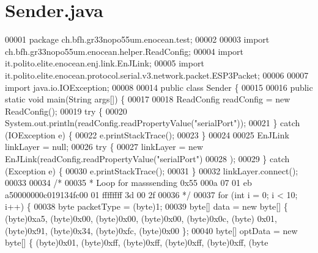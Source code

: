 \section{Sender.\+java}
\label{Sender_8java_source}

\begin{DoxyCode}
00001 \textcolor{keyword}{package }ch.bfh.gr33nopo55um.enocean.test;
00002 
00003 \textcolor{keyword}{import} ch.bfh.gr33nopo55um.enocean.helper.ReadConfig;
00004 \textcolor{keyword}{import} it.polito.elite.enocean.enj.link.EnJLink;
00005 \textcolor{keyword}{import} it.polito.elite.enocean.protocol.serial.v3.network.packet.ESP3Packet;
00006 
00007 \textcolor{keyword}{import} java.io.IOException;
00008 
00014 \textcolor{keyword}{public} \textcolor{keyword}{class }Sender \{
00015 
00016     \textcolor{keyword}{public} \textcolor{keyword}{static} \textcolor{keywordtype}{void} main(String args[]) \{
00017 
00018         ReadConfig readConfig = \textcolor{keyword}{new} ReadConfig();
00019         \textcolor{keywordflow}{try} \{
00020             System.out.println(readConfig.readPropertyValue(\textcolor{stringliteral}{"serialPort"}));
00021         \} \textcolor{keywordflow}{catch} (IOException e) \{
00022             e.printStackTrace();
00023         \}
00024 
00025         EnJLink linkLayer = null;
00026         \textcolor{keywordflow}{try} \{
00027             linkLayer = \textcolor{keyword}{new} EnJLink(readConfig.readPropertyValue(\textcolor{stringliteral}{"serialPort"})
00028             );
00029         \} \textcolor{keywordflow}{catch} (Exception e) \{
00030             e.printStackTrace();
00031         \}
00032         linkLayer.connect();
00033 
00034         \textcolor{comment}{/*}
00035 \textcolor{comment}{        * Loop for masssending 0x55 000a 07 01 eb a50000000c019134fc00 01 ffffffff 3d 00 2f}
00036 \textcolor{comment}{        */}
00037         \textcolor{keywordflow}{for} (\textcolor{keywordtype}{int} i = 0; i < 10; i++) \{
00038             byte packetType = (byte)1;
00039             byte[] data = \textcolor{keyword}{new} byte[] \{ (byte)0xa5, (byte)0x00, (byte)0x00, (byte)0x00, (byte)0x0c, (byte)
      0x01, (byte)0x91, (byte)0x34, (byte)0xfc, (byte)0x00 \};
00040             byte[] optData = \textcolor{keyword}{new} byte[] \{ (byte)0x01, (byte)0xff, (byte)0xff, (byte)0xff, (byte)0xff, (byte

\end{DoxyCode}
